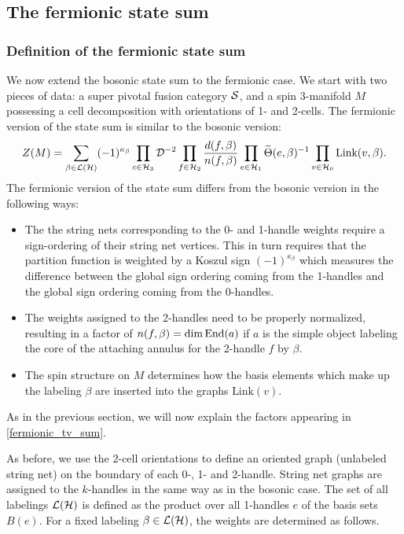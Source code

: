 \subsection{The fermionic state sum}


\subsubsection{Definition of the fermionic state sum}

We now extend the bosonic state sum to the fermionic case. 
We start with two pieces of data: a super pivotal fusion category $\mathcal{S}$, and a spin
3-manifold $M$ possessing a cell decomposition with orientations of 1- and 2-cells.
The fermionic version of the state sum is similar to the bosonic version:
\begin{align}
\label{fermionic_tv_sum}
	Z(M) = \sum_{\beta\in\mathcal{L}(\mathcal{H})}(-1)^{\kappa_\beta}
		\prod_{c\in\mathcal{H}_3} \mathcal{D}^{-2}
		\prod_{f\in\mathcal{H}_2} \frac{d(f, \beta)}{n(f,\beta)}
		\prod_{e\in\mathcal{H}_1}  \widetilde \Theta(e, \beta)^{-1}
		\prod_{v\in\mathcal{H}_0} \text{Link}(v, \beta) .
\end{align}
The fermionic version of the state sum differs from the bosonic version in the following ways:
\begin{itemize} 
\item 
The the string nets corresponding to the 0- and 1-handle weights require a sign-ordering of their string net vertices. 
This in turn requires that the partition function is weighted by a Koszul sign $(-1)^{\kappa_\beta}$
which measures the difference between the global sign ordering coming from the 1-handles and the global sign ordering coming from the 0-handles.
\item The weights assigned to the 2-handles need to be properly normalized, 
resulting in a factor of $n(f,\beta) = \dim \text{End}(a)$ if $a$ is the simple object labeling the core of the attaching annulus for the 2-handle $f$ by $\beta$.
\item The spin structure on $M$ determines how the basis elements which make up the labeling $\beta$ are inserted into
the graphs $\text{Link}(v)$.
\end{itemize} 
As in the previous section, we will now explain 
the factors appearing in \eqref{fermionic_tv_sum}. 

As before, we use the 2-cell orientations to define an oriented graph (unlabeled string net) on the boundary of each 0-, 1- and 2-handle.
String net graphs are assigned to the $k$-handles in the same way as in the bosonic case. 
The set of all labelings $\mathcal{L}(\mathcal{H})$ is defined as the product over all 1-handles $e$ of the basis sets $B(e)$.
For a fixed labeling $\beta \in \mathcal{L}(\mathcal{H})$, the weights are determined as follows.

